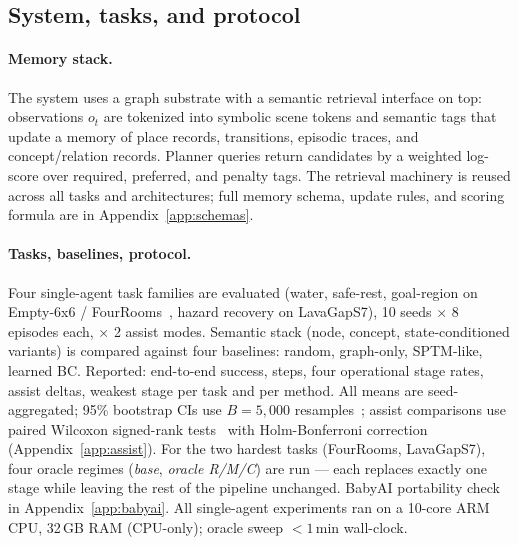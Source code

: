 \documentclass{article}
\begin{document}
\subsection{System, tasks, and protocol}
\label{sec:single-setup}

\paragraph{Memory stack.}
The system uses a graph substrate with a semantic retrieval interface on top: observations $o_t$ are tokenized into symbolic scene tokens and semantic tags that update a memory of place records, transitions, episodic traces, and concept/relation records. Planner queries return candidates by a weighted log-score over required, preferred, and penalty tags. The retrieval machinery is reused across all tasks and architectures; full memory schema, update rules, and scoring formula are in Appendix~\ref{app:schemas}.

\paragraph{Tasks, baselines, protocol.}
Four single-agent task families are evaluated (water, safe-rest, goal-region on Empty-6x6 / FourRooms~\citep{sutton1999between}, hazard recovery on LavaGapS7), 10 seeds $\times$ 8 episodes each, $\times$ 2 assist modes. Semantic stack (node, concept, state-conditioned variants) is compared against four baselines: random, graph-only, SPTM-like, learned BC. Reported: end-to-end success, steps, four operational stage rates, assist deltas, weakest stage per task and per method. All means are seed-aggregated; 95\% bootstrap CIs use $B{=}5{,}000$ resamples~\citep{efron1979bootstrap}; assist comparisons use paired Wilcoxon signed-rank tests~\citep{wilcoxon1945individual} with Holm-Bonferroni correction~\citep{holm1979simple} (Appendix~\ref{app:assist}). For the two hardest tasks (FourRooms, LavaGapS7), four oracle regimes (\emph{base}, \emph{oracle R/M/C}) are run — each replaces exactly one stage while leaving the rest of the pipeline unchanged. BabyAI portability check in Appendix~\ref{app:babyai}. All single-agent experiments ran on a 10-core ARM CPU, 32\,GB RAM (CPU-only); oracle sweep $<1$\,min wall-clock.
\end{document}
